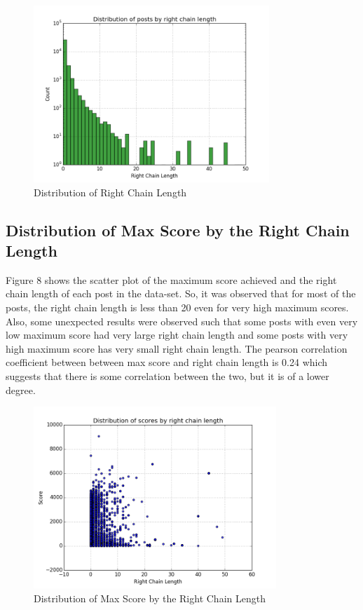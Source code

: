 \documentclass{article} %
\begin{document}
\begin{figure}[h]
\begin{center}
\includegraphics[width=3.5in]{right_chain.png}
\caption{Distribution of Right Chain Length}
\end{center}
\end{figure}

\newpage

\subsection{Distribution of Max Score by the Right Chain Length}

Figure 8 shows the scatter plot of the maximum score achieved and the right chain length of each post in the data-set. So, it was observed that for most of the posts, the right chain length is less than 20 even for very high maximum scores. Also, some unexpected results were observed such that some posts with even very low maximum score had very large right chain length and some posts with very high maximum score has very small right chain length.
The pearson correlation coefficient between between max score and right chain length is 0.24 which suggests that there is some correlation between the two, but it is of a lower degree.

\begin{figure}[h]
\begin{center}
\includegraphics[width=3.6in]{score_right_chain.png}
\caption{Distribution of Max Score by the Right Chain Length}
\end{center}
\end{figure}
\end{document}
